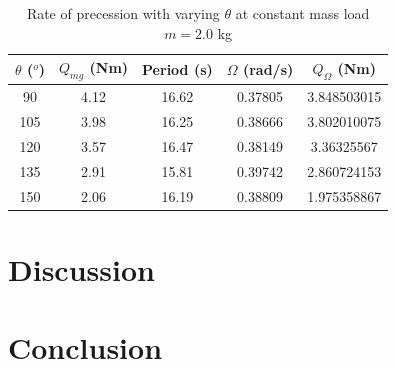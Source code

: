 \documentclass[8pt]{article}
\begin{document}
\begin{table}[H]
    \centering
    \begin{tabular}{|c|c|c|c|c|}
        \hline
        $\theta$ ($^o$) & $Q_{mg}$ (Nm) & Period (s) & $\Omega$ (rad/s) & $Q_{\Omega} $ (Nm) \\
        \hline
        90 & 4.12 & 16.62 & 0.37805 & 3.848503015\\
        105 & 3.98 & 16.25 & 0.38666 & 3.802010075\\
        120 & 3.57 & 16.47 & 0.38149 & 3.36325567\\
        135 & 2.91 & 15.81 & 0.39742 & 2.860724153\\
        150 & 2.06 & 16.19 & 0.38809 & 1.975358867\\
        \hline
    \end{tabular}
    \caption{Rate of precession with varying $\theta$ at constant mass load $m = 2.0$ kg}
\end{table}







\section{Discussion}



\section{Conclusion}
\end{document}
